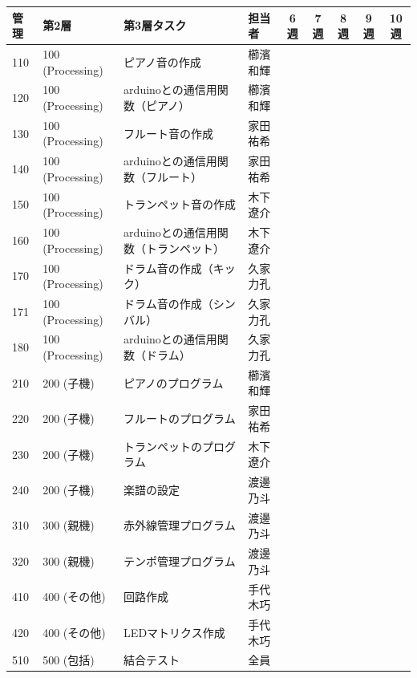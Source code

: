 \documentclass[a4paper,11pt]{ltjsarticle}
\providecommand{\％}{\%}
\begin{document}
\begin{longtable}{|p{0.9cm}|p{2.0cm}|p{4.0cm}|p{1.5cm}|c|c|c|c|c|}
\hline
\rowcolor[gray]{0.9}
管理 & 第2層 & 第3層タスク & 担当者 & 6週 & 7週 & 8週 & 9週 & 10週 \\
\hline
110 & 100 (Processing) & ピアノ音の作成 & 櫛濱和輝 & \cellcolor{ganttCell} & & & & \\
\hline
120 & 100 (Processing) & arduinoとの通信用関数（ピアノ） & 櫛濱和輝 & & & \cellcolor{ganttCell} & \cellcolor{ganttCell} & \\
\hline
130 & 100 (Processing) & フルート音の作成 & 家田祐希 & \cellcolor{ganttCell} & & & & \\
\hline
140 & 100 (Processing) & arduinoとの通信用関数（フルート） & 家田祐希 & & & \cellcolor{ganttCell} & \cellcolor{ganttCell} & \\
\hline
150 & 100 (Processing) & トランペット音の作成 & 木下遼介 & \cellcolor{ganttCell} & & & & \\
\hline
160 & 100 (Processing) & arduinoとの通信用関数（トランペット） & 木下遼介 & & & \cellcolor{ganttCell} & \cellcolor{ganttCell} & \\
\hline
170 & 100 (Processing) & ドラム音の作成（キック） & 久家力孔 & \cellcolor{ganttCell} & & & & \\
\hline
171 & 100 (Processing) & ドラム音の作成（シンバル） & 久家力孔 & \cellcolor{ganttCell} & & & & \\
\hline
180 & 100 (Processing) & arduinoとの通信用関数（ドラム） & 久家力孔 & & & \cellcolor{ganttCell} & \cellcolor{ganttCell} & \\
\hline
210 & 200 (子機) & ピアノのプログラム & 櫛濱和輝 & & \cellcolor{ganttCell} & & & \\
\hline
220 & 200 (子機) & フルートのプログラム & 家田祐希 & & \cellcolor{ganttCell} & & & \\
\hline
230 & 200 (子機) & トランペットのプログラム & 木下遼介 & & \cellcolor{ganttCell} & & & \\
\hline
240 & 200 (子機) & 楽譜の設定 & 渡邊乃斗 & \cellcolor{ganttCell} & & & & \\
\hline
310 & 300 (親機) & 赤外線管理プログラム & 渡邊乃斗 & & \cellcolor{ganttCell} & & & \\
\hline
320 & 300 (親機) & テンポ管理プログラム & 渡邊乃斗 & & & \cellcolor{ganttCell} & \cellcolor{ganttCell} & \\
\hline
410 & 400 (その他) & 回路作成 & 手代木巧 & \cellcolor{ganttCell} & & & & \\
\hline
420 & 400 (その他) & LEDマトリクス作成 & 手代木巧 & & \cellcolor{ganttCell} & \cellcolor{ganttCell} & \cellcolor{ganttCell} & \\
\hline
510 & 500 (包括) & 結合テスト & 全員 & & & & & \cellcolor{ganttCell} \\
\hline
\end{longtable}
\end{document}
